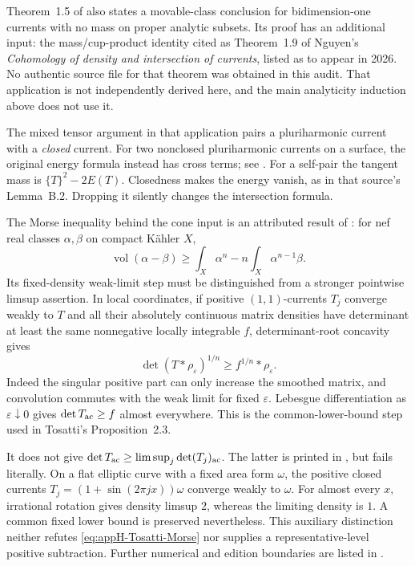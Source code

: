 Theorem~1.5 of \cite{DinhNguyenNguyen26SiuV2} also states a
movable-class conclusion for bidimension-one currents with no mass
on proper analytic subsets. Its proof has an additional input:
the mass/cup-product identity cited as Theorem~1.9 of Nguyen's
\emph{Cohomology of density and intersection of currents}, listed
as to appear in 2026. No authentic source file for that theorem was
obtained in this audit. That application is not independently derived
here, and the main analyticity induction above does not use it.

The mixed tensor argument in that application pairs a pluriharmonic
current with a \emph{closed} current. For two nonclosed pluriharmonic
currents on a surface, the original energy formula instead has cross
terms; see \cite[Theorem~2.2, actual pp.~8--9]{DinhNguyenSibony19SurfaceV2}.
For a self-pair the tangent mass is $\{T\}^2-2E(T)$.
Closedness makes the energy vanish, as in that source's Lemma~B.2.
Dropping it silently changes the intersection formula.

The Morse inequality behind the cone input is an attributed result
of \cite[Theorem~1.1]{Tosatti26MorseV2}: for nef real classes
$\alpha,\beta$ on compact K\"ahler $X$,
\begin{equation*}
 \operatorname{vol}(\alpha-\beta)
       \geq\int_X\alpha^n-n\int_X\alpha^{n-1}\beta.
\tag{H.61}\label{eq:appH-Tosatti-Morse}
\end{equation*}
Its fixed-density weak-limit step must be distinguished from a
stronger pointwise limsup assertion. In local coordinates, if positive
$(1,1)$-currents $T_j$ converge weakly to $T$ and all their absolutely
continuous matrix densities have determinant at least the same
nonnegative locally integrable $f$, determinant-root concavity gives
\[
 \det(T*\rho_\varepsilon)^{1/n}
        \geq f^{1/n}*\rho_\varepsilon.
\]
Indeed the singular positive part can only increase the smoothed
matrix, and convolution commutes with the weak limit for fixed
$\varepsilon$. Lebesgue differentiation as $\varepsilon\downarrow0$
gives $\det T_{\rm ac}\geq f$ almost everywhere.
This is the common-lower-bound step used in Tosatti's Proposition~2.3.

It does not give $\det T_{\rm ac}\geq\limsup_j\det(T_j)_{\rm ac}$.
The latter is printed in \cite[Proposition~2.1, printed p.~1048]{Bou02b},
but fails literally. On a flat elliptic curve with a fixed area form
$\omega$, the positive closed currents
$T_j=(1+\sin(2\pi jx))\omega$ converge weakly to $\omega$.
For almost every $x$, irrational rotation gives density limsup $2$,
whereas the limiting density is $1$. A common fixed lower bound
is preserved nevertheless. This auxiliary distinction neither refutes
\eqref{eq:appH-Tosatti-Morse} nor supplies a representative-level
positive subtraction. Further numerical and edition boundaries are
listed in .


